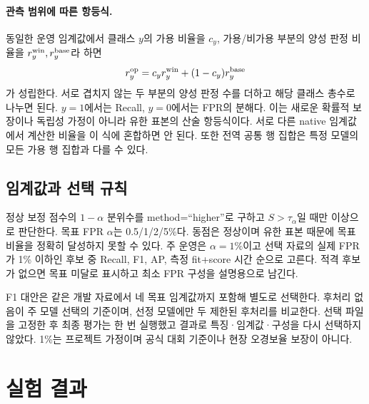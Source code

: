 \documentclass{article}
\begin{document}
\paragraph{관측 범위에 따른 항등식.}
동일한 운영 임계값에서 클래스 $y$의 가용 비율을 $c_y$, 가용/비가용 부분의 양성 판정 비율을 $r_y^{\rm win},r_y^{\rm base}$라 하면
\begin{equation}
r_y^{\rm op}=c_y r_y^{\rm win}+(1-c_y)r_y^{\rm base}
\label{eq:decomp}
\end{equation}
가 성립한다. 서로 겹치지 않는 두 부분의 양성 판정 수를 더하고 해당 클래스 총수로 나누면 된다. $y=1$에서는 Recall, $y=0$에서는 FPR의 분해다. 이는 새로운 확률적 보장이나 독립성 가정이 아니라 유한 표본의 산술 항등식이다. 서로 다른 native 임계값에서 계산한 비율을 이 식에 혼합하면 안 된다. 또한 전역 공통 행 집합은 특정 모델의 모든 가용 행 집합과 다를 수 있다.

\subsection{임계값과 선택 규칙}
정상 보정 점수의 $1-\alpha$ 분위수를 method=``higher''로 구하고 $S>\tau_\alpha$일 때만 이상으로 판단한다. 목표 FPR $\alpha$는 0.5/1/2/5\%다. 동점은 정상이며 유한 표본 때문에 목표 비율을 정확히 달성하지 못할 수 있다. 주 운영은 $\alpha=1\%$이고 선택 자료의 실제 FPR가 1\% 이하인 후보 중 Recall, F1, AP, 측정 fit+score 시간 순으로 고른다. 적격 후보가 없으면 목표 미달로 표시하고 최소 FPR 구성을 설명용으로 남긴다.

F1 대안은 같은 개발 자료에서 네 목표 임계값까지 포함해 별도로 선택한다. 후처리 없음이 주 모델 선택의 기준이며, 선정 모델에만 두 제한된 후처리를 비교한다. 선택 파일을 고정한 후 최종 평가는 한 번 실행했고 결과로 특징·임계값·구성을 다시 선택하지 않았다. 1\%는 프로젝트 가정이며 공식 대회 기준이나 현장 오경보율 보장이 아니다.

\section{실험 결과}
\end{document}
